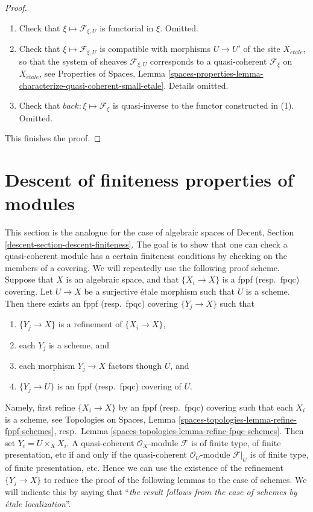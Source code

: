 \begin{proof}
\begin{enumerate}
\item Check that $\xi \mapsto \mathcal{F}_{\xi, U}$ is functorial in $\xi$.
Omitted.
\item Check that $\xi \mapsto \mathcal{F}_{\xi, U}$ is compatible
with morphisms $U \to U'$ of the site $X_{\acute{e}tale}$, so that
the system of sheaves $\mathcal{F}_{\xi, U}$ corresponds to a quasi-coherent
$\mathcal{F}_\xi$ on $X_{\acute{e}tale}$, see
Properties of Spaces,
Lemma \ref{spaces-properties-lemma-characterize-quasi-coherent-small-etale}.
Details omitted.
\item Check that $back : \xi \mapsto \mathcal{F}_\xi$ is quasi-inverse
to the functor constructed in (1). Omitted.
\end{enumerate}
This finishes the proof.
\end{proof}





\section{Descent of finiteness properties of modules}
\label{section-descent-finiteness}

\noindent
This section is the analogue for the case of algebraic spaces of
Decent, Section \ref{descent-section-descent-finiteness}.
The goal is to show that one can check a quasi-coherent module
has a certain finiteness conditions by checking on the members of
a covering. We will repeatedly use the following proof scheme.
Suppose that $X$ is an algebraic space, and that $\{X_i \to X\}$
is a fppf (resp.\ fpqc) covering. Let $U \to X$ be a surjective
\'etale morphism such that $U$ is a scheme. Then there exists an
fppf (resp.\ fpqc) covering $\{Y_j \to X\}$ such that
\begin{enumerate}
\item $\{Y_j \to X\}$ is a refinement of $\{X_i \to X\}$,
\item each $Y_j$ is a scheme, and
\item each morphism $Y_j \to X$ factors though $U$, and
\item $\{Y_j \to U\}$ is an fppf (resp.\ fpqc) covering of $U$.
\end{enumerate}
Namely, first refine $\{X_i \to X\}$ by an fppf (resp.\ fpqc)
covering such that each $X_i$ is a scheme, see
Topologies on Spaces, Lemma \ref{spaces-topologies-lemma-refine-fppf-schemes},
resp.\ Lemma \ref{spaces-topologies-lemma-refine-fpqc-schemes}.
Then set $Y_i = U \times_X X_i$. A quasi-coherent
$\mathcal{O}_X$-module $\mathcal{F}$ is of finite type, of
finite presentation, etc if and only if the quasi-coherent
$\mathcal{O}_U$-module $\mathcal{F}|_U$ is of finite type, of
finite presentation, etc. Hence we can use the existence of the
refinement $\{Y_j \to X\}$ to reduce the proof of the following
lemmas to the case of schemes. We will indicate this by saying
that ``{\it the result follows from the case of schemes by
\'etale localization}''.

